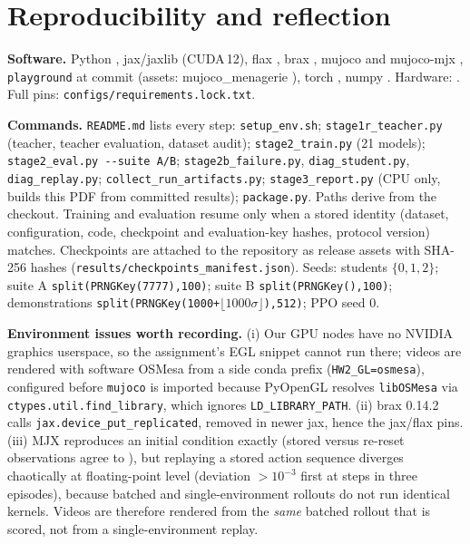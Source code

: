 \documentclass[11pt]{article}
\begin{document}
\section{Reproducibility and reflection}
\textbf{Software.} Python \verpython, jax/jaxlib \verjax{} (CUDA\,12), flax
\verflax, brax \verbrax, mujoco and mujoco-mjx \vermujoco,
\texttt{playground} \verplayground{} at commit \texttt{\playgroundSha} (assets:
mujoco\_menagerie \texttt{\menagerieSha}), torch \vertorch, numpy \vernumpy.
Hardware: \gpuName{}. Full pins: \texttt{configs/requirements.lock.txt}.

\textbf{Commands.} \texttt{README.md} lists every step:
\texttt{setup\_env.sh}; \texttt{stage1r\_teacher.py} (teacher, teacher evaluation,
dataset audit); \texttt{stage2\_train.py} (21 models); \texttt{stage2\_eval.py
-{}-suite A/B}; \texttt{stage2b\_failure.py}, \texttt{diag\_student.py},
\texttt{diag\_replay.py}; \texttt{collect\_run\_artifacts.py};
\texttt{stage3\_report.py} (CPU only, builds this PDF from committed results);
\texttt{package.py}. Paths derive from the checkout. Training and evaluation
resume only when a stored identity (dataset, configuration, code, checkpoint and
evaluation-key hashes, protocol version) matches. Checkpoints are attached to the
repository as release assets with SHA-256 hashes
(\texttt{results/checkpoints\_manifest.json}). Seeds: students $\{0,1,2\}$;
suite A \texttt{split(PRNGKey(7777),100)}; suite B
\texttt{split(PRNGKey(\freshBase),100)}; demonstrations
\texttt{split(PRNGKey(1000+$\lfloor1000\sigma\rfloor$),512)}; PPO seed 0.

\textbf{Environment issues worth recording.} (i) Our GPU nodes have no NVIDIA
graphics userspace, so the assignment's EGL snippet cannot run there; videos are
rendered with software OSMesa from a side conda prefix
(\texttt{HW2\_GL=osmesa}), configured before \texttt{mujoco} is imported because
PyOpenGL resolves \texttt{libOSMesa} via \texttt{ctypes.util.find\_library}, which
ignores \texttt{LD\_LIBRARY\_PATH}. (ii) brax 0.14.2 calls
\texttt{jax.device\_put\_replicated}, removed in newer jax, hence the jax/flax
pins. (iii) MJX reproduces an initial condition exactly (stored versus re-reset
observations agree to \replayResetDev), but replaying a stored action sequence
diverges chaotically at floating-point level (deviation $>10^{-3}$ first at steps
\replayFirstBig{} in three episodes), because batched and single-environment
rollouts do not run identical kernels. Videos are therefore rendered from the
\emph{same} batched rollout that is scored, not from a single-environment replay.
\end{document}

